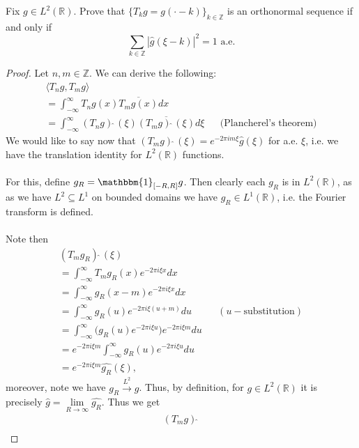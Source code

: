 \documentclass[12pt]{article}
\newenvironment{ex}[2][Exercise]{\begin{trivlist}
\item[\hskip \labelsep {\bfseries #1}\hskip \labelsep {\bfseries #2.}]}{\end{trivlist}}
\begin{document}
\begin{ex}{12}
    Fix $g \in L^2(\mathbb{R})$. Prove that $\{T_kg = g(\cdot - k)\}_{k \in \mathbb{Z}}$ is an orthonormal sequence if and only if 
    $$\sum_{k \in \mathbb{Z}} |\hat{g}(\xi - k)|^2 = 1 \text{ a.e.}$$
    \begin{proof}
        Let $n, m \in \mathbb{Z}$. We can derive the following:
        \begin{align*}
            \langle T_ng, T_mg \rangle \\
            = \int_{-\infty}^\infty T_ng(x)\overline{T_mg(x)}dx \\
            = \int_{-\infty}^\infty (T_ng)\hat{\;}(\xi)\overline{(T_mg)\hat{\;}(\xi)} d\xi && \text{(Plancherel's theorem)}
        \end{align*}
        We would like to say now that $(T_mg)\hat{\;}(\xi) = e^{-2\pi i m \xi}\hat{g}(\xi)$ for a.e. $\xi$, i.e. we have the translation identity for $L^2(\mathbb{R})$ functions. 
        \\ \\ For this, define $g_R = \mathbbm{1}_{[-R, R]}g$. Then clearly each $g_R$ is in $L^2(\mathbb{R})$, as as we have $L^2 \subseteq L^1$ on bounded domains we have $g_R \in L^1(\mathbb{R})$, i.e. the Fourier transform is defined. \\ \\
        Note then 
        \begin{align*}
            (T_m g_R)\hat{\;}(\xi) \\
            = \int_{-\infty}^\infty T_mg_R(x)e^{-2\pi i \xi x}dx \\ 
            = \int_{-\infty}^\infty g_R(x- m)e^{-2\pi i \xi x}dx \\ 
            = \int_{-\infty}^\infty g_R(u)e^{-2\pi i \xi (u + m)}du && (u-\text{substitution}) \\
            = \int_{-\infty}^\infty \Big ( g_R(u)e^{-2\pi i \xi u} \Big)e^{-2\pi i \xi m} du \\
            = e^{-2\pi i \xi m} \int_{-\infty}^\infty g_R(u)e^{-2\pi i \xi u} du \\ 
            = e^{-2\pi i \xi m} \hat{g_R}(\xi),
        \end{align*}
        moreover, note we have $g_R \xrightarrow{L^2} g$. Thus, by definition, for $g \in L^2(\mathbb{R})$ it is precisely $\hat{g} = \underset{R \rightarrow \infty}{\lim} \hat{g_R}$. Thus we get 
        \begin{align*}
            (T_m g)\hat{\;} \\

\end{align*}
\end{proof}
\end{ex}
\end{document}
